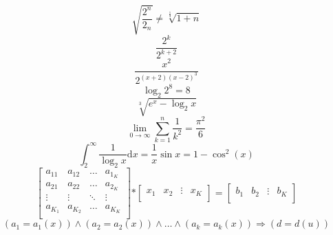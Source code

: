 \documentclass[a4paper]{article}
\begin{document}
$$ \sqrt{ \frac{2^{n}}{2_n}} \neq \sqrt[\frac{1}{3}]{1+n} $$
$$\frac{2^{k}}{2^{k+2}}$$
$$\frac{x^{2}}{2^{(x+2)(x-2)^{3}}}$$
$$\log_2{2^{8}}=8$$
$$\sqrt[3]{e^{x}-\log_2{x}}$$
$$\lim_{0\to\infty}\sum_{k=1}^{n}\frac{1}{k^{2}}=\frac{\pi^{2}}{6}$$
$$ \int_2^{\infty}\frac{1}{\log_2{x}}\mathrm{d} x=\frac{1}{x}\sin\mathrm{}x=1-\cos^{2}(\mathrm{}x) $$
$$ 
\left[ \begin{array}{cccc}
a_{11} & a_{12} & \ldots & a_{1}_K \\
a_{21} & a_{22} & \ldots & a_{2}_K\\
\vdots & \vdots & \ddots & \vdots\\
a_{K}_1 & a_{K}_2 & \ldots & a_{K}_K \\
\end{array} \right]
\mathbf{*}
\left[ \begin{array}{c}
x_{1} & x_{2} & \vdots & x_{K} \\ 
\end{array} \right]=\left[ \begin{array}{c}
b_{1} & b_{2} & \vdots & b_{K} \\ 
\end{array} \right]
$$
$$ (a_1=a_1(x))  \wedge  (a_2=a_2(x))\wedge \dots \wedge (a_k=a_k(x)) \Rightarrow (d=d(u))$$
\end{document}
